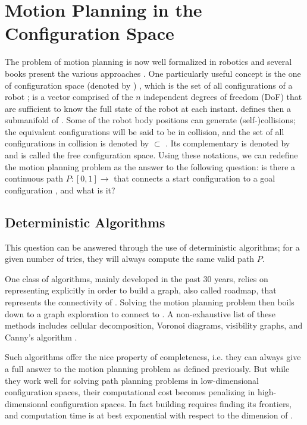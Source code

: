 \section{Motion Planning in the Configuration Space}
\label{sec:chap1-motion-planning}

The problem of motion planning is now well formalized in robotics and
several books present the various approaches
\cite{lato91,chos05,lava06}. One particularly useful concept is the
one of configuration space (denoted by \cspace) \cite{loza83}, which
is the set of all configurations \config{} of a robot \robot;
\config{} is a vector comprised of the $n$ independent degrees of
freedom (DoF) that are sufficient to know the full state of the robot
at each instant. \cspace defines then a submanifold of \espace. Some
of the robot body positions can generate (self-)collisions; the
equivalent configurations will be said to be in collision, and the set
of all configurations in collision is denoted by \cobs
$\subset$ \cspace. Its complementary is denoted by \cfree and is
called the free configuration space. Using these notations, we can
redefine the motion planning problem as the answer to the following
question: is there a continuous path $P: [0,1] \rightarrow$ \cfree
that connects a start configuration  to a goal configuration
, and what is it?

\subsection{Deterministic Algorithms}
\label{subsec:chap1-deterministic algorithms}

This question can be answered through the use of deterministic
algorithms; for a given number of tries, they will always compute the
same valid path $P$.

One class of algorithms, mainly developed in the past 30 years, relies
on representing \cobs explicitly in order to build a graph, also
called roadmap, that represents the connectivity of \cfree. Solving
the motion planning problem then boils down to a graph exploration to
connect  to . A non-exhaustive list of these
methods includes cellular decomposition, Voronoi diagrams, visibility
graphs, and Canny's algorithm \cite{good04}.

Such algorithms offer the nice property of completeness, i.e. they can
always give a full answer to the motion planning problem as defined
previously. But while they work well for solving path planning
problems in low-dimensional configuration spaces, their computational
cost becomes penalizing in high-dimensional configuration spaces. In
fact building \cfree requires finding its frontiers, and computation
time is at best exponential with respect to the dimension of \cspace.

